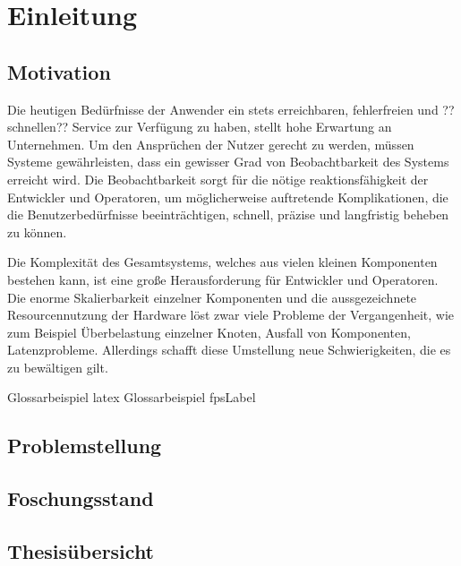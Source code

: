 %

\chapter{Einleitung}


\section{Motivation}
	Die heutigen Bedürfnisse der Anwender ein stets erreichbaren, fehlerfreien und ??schnellen?? Service zur Verfügung zu haben, stellt hohe Erwartung an Unternehmen. Um den Ansprüchen der Nutzer gerecht zu werden, müssen Systeme gewährleisten, dass ein gewisser Grad von Beobachtbarkeit des Systems erreicht wird. Die Beobachtbarkeit sorgt für die nötige reaktionsfähigkeit der Entwickler und Operatoren, um möglicherweise auftretende Komplikationen, die die  Benutzerbedürfnisse beeinträchtigen, schnell, präzise und langfristig beheben zu können.
	
	Die Komplexität des Gesamtsystems, welches aus vielen kleinen Komponenten bestehen kann, ist eine große Herausforderung für Entwickler und Operatoren. Die enorme Skalierbarkeit einzelner Komponenten und die aussgezeichnete Resourcennutzung der Hardware löst zwar viele Probleme der Vergangenheit, wie zum Beispiel Überbelastung einzelner Knoten, Ausfall von Komponenten, Latenzprobleme. Allerdings schafft diese Umstellung neue Schwierigkeiten, die es zu bewältigen gilt.
	
	Glossarbeispiel \gls{latex}
	Glossarbeispiel \gls{fpsLabel}
\section{Problemstellung}
\section{Foschungsstand}
\section{Thesisübersicht}
